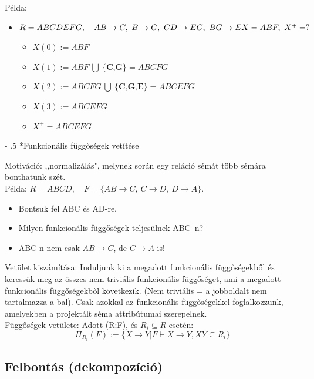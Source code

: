 \documentclass[tikz,12pt,margin=0px]{article}
\makeatletter
\renewcommand\paragraph{%
	\@startsection{paragraph}{4}{0mm}%
	{-\baselineskip}%
	{.5\baselineskip}%
	{\normalfont\normalsize\bfseries}}
\makeatother
\begin{document}
{    \noindent Példa:
    \begin{itemize}
        \item $R=ABCDEFG,\quad {AB \to C,\ B \to G,\ CD \to EG,\ BG \to E}\\
        X=ABF,\ X^+=?$
        \begin{itemize}
            \item $X(0):=ABF$
            \item $X(1):=ABF\ \bigcup\ \{\textbf{C,G}\}=ABCFG$
            \item $X(2):=ABCFG\ \bigcup\ \{\textbf{C,G,E}\}=ABCEFG$
            \item $X(3):=ABCEFG$
            \item $X^+= ABCEFG$
        \end{itemize}
    \end{itemize}

    \paragraph*{Funkcionális függőségek vetítése\\}

    Motiváció: ,,normalizálás", melynek során egy reláció sémát több sémára bonthatunk szét.\\

    \noindent Példa: $R=ABCD,\quad F=\{AB \to C,\ C \to D,\ D \to A\}$.
    \begin{itemize}
        \item Bontsuk fel ABC és AD-re.
        \item Milyen funkcionális függőségek teljesülnek ABC–n?
        \item ABC-n nem csak $AB \to C$, de $C \to A$ is!
    \end{itemize}

    \noindent Vetület kiszámítása: Induljunk ki a megadott funkcionális függőségekből és keressük meg az összes nem triviális funkcionális függőséget, ami a megadott funkcionális függőségekből következik. (Nem triviális = a jobboldalt nem tartalmazza a bal). Csak azokkal az funkcionális függőségekkel foglalkozzunk, amelyekben a projektált séma attribútumai szerepelnek. \\

    \noindent Függőségek vetülete: Adott (R;F), és $R_i \subseteq R $ esetén:
    \[
        \Pi_{R_i}(F):=\big\{X \to Y | F \vdash X \to Y, XY \subseteq R_i\big\}
    \]

	\subsection*{Felbontás (dekompozíció)}

}
\end{document}
